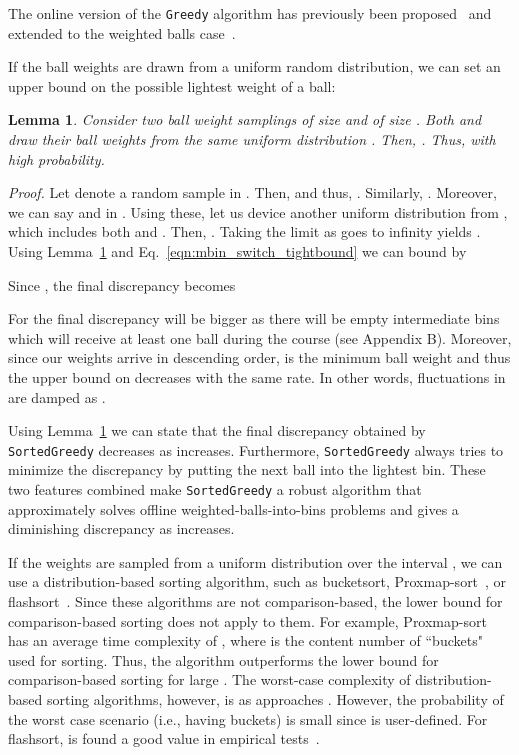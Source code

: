 \documentclass[12pt,psfig,a4]{article}
\newcommand{\sg}{\texttt{SortedGreedy}}
\newcommand{\gr}{\texttt{Greedy}}
\newtheorem{mylemma}{Lemma}
\theoremstyle{plain}
\begin{document}
The online version of the \gr{} algorithm has previously been proposed~\cite{azar1994balanced,azar1999balanced} and extended to the weighted balls case~\cite{talwar2007balanced}. 

 If the ball weights are drawn from a uniform random distribution, we can set an upper bound on the possible lightest weight of a ball:
 \begin{mylemma}
	Consider two ball weight samplings  of size  and  of size . Both  and  draw their ball weights from the same uniform distribution .  Then, . Thus,  with high probability. 
	\label{lemma:wn1}
\end{mylemma}
\textit{Proof.} Let  denote a random sample in . Then,  and thus, . Similarly, . Moreover, we can say  and   in . Using these, let us device another uniform distribution  from , which includes both  and . Then, . Taking the limit as  goes to infinity yields  .  \\

Using Lemma~\ref{lemma:wn1} and Eq.~\ref{eqn:mbin_switch_tightbound} we can bound  by
 
 
Since , the final discrepancy becomes
   

For  the final discrepancy will be bigger as there will be empty intermediate bins which will receive at least one ball during the course (see Appendix B). Moreover, since our weights arrive in descending order,  is the minimum ball weight and thus the upper bound on  decreases with the same rate. In other words, fluctuations in  are damped as . 

Using Lemma~\ref{lemma:wn1} we can state that the final discrepancy obtained by \sg{} decreases as  increases. Furthermore, \sg{} always tries to minimize the discrepancy by putting the next ball into the lightest bin. These two features combined make \sg{} a robust algorithm that approximately solves offline weighted-balls-into-bins problems and gives a diminishing discrepancy as  increases. 

If the weights are sampled from a uniform distribution over the interval , we can use a distribution-based sorting algorithm, such as bucketsort, Proxmap-sort~\cite{standish1997data}, or flashsort~\cite{neubert1998flashsort}. Since these algorithms are not comparison-based, the  lower bound for comparison-based sorting does not apply to them. For example, Proxmap-sort~\cite{standish1997data} has an average time complexity of , where  is the content number of ``buckets" used for sorting. 
Thus, the algorithm outperforms the lower bound for comparison-based sorting for large . The worst-case complexity of distribution-based sorting algorithms, however, is  as  approaches . 
However, the probability of the worst case scenario (i.e., having  buckets) is small since  is user-defined. For flashsort,  is found a good value in empirical tests~\cite{neubert1998flashsort}.  
\end{document}
